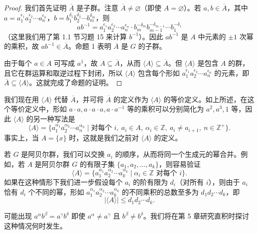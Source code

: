 \begin{proof}
我们首先证明 \(\overline{A}\) 是子群。注意 \(\overline{A} \neq \varnothing\)（即使 \(A = \varnothing\)）。若 \(a, b \in \overline{A}\)，其中 \(a = a_1^{\epsilon_1} a_2^{\epsilon_2} \cdots a_n^{\epsilon_n}\)，\(b = b_1^{\delta_1} b_2^{\delta_2} \cdots b_m^{\delta_m}\)，则
\[
ab^{-1} = a_1^{\epsilon_1} a_2^{\epsilon_2} \cdots a_n^{\epsilon_n} \cdot b_m^{-\delta_m} b_{m-1}^{-\delta_{m-1}} \cdots b_1^{-\delta_1}
\]
（这里我们用了第 1.1 节习题 15 来计算 \(b^{-1}\)）。因此 \(ab^{-1}\) 是 \(A\) 中元素的 \(\pm 1\) 次幂的乘积，故 \(ab^{-1} \in \overline{A}\)。命题 1 表明 \(\overline{A}\) 是 \(G\) 的子群。

由于每个 \(a \in A\) 可写成 \(a^1\)，故 \(A \subseteq \overline{A}\)，从而 \(\langle A \rangle \subseteq \overline{A}\)。但 \(\langle A \rangle\) 是包含 \(A\) 的群，且它在群运算和取逆过程下封闭，所以 \(\langle A \rangle\) 包含每个形如 \(a_1^{\epsilon_1} a_2^{\epsilon_2} \cdots a_n^{\epsilon_n}\) 的元素，即 \(\overline{A} \subseteq \langle A \rangle\)。这就完成了命题的证明。
\end{proof}

我们现在用 \(\langle A \rangle\) 代替 \(\overline{A}\)，并可将 \(\overline{A}\) 的定义作为 \(\langle A \rangle\) 的等价定义。如上所述，在这个等价定义中，形如 \(a \cdot a, a \cdot a \cdot a, a \cdot a^{-1}\) 等的乘积可以分别简化为 \(a^2, a^3, 1\) 等，因此 \(\langle A \rangle\) 的另一种写法是
\[
\langle A \rangle = \{ a_1^{\alpha_1} a_2^{\alpha_2} \cdots a_n^{\alpha_n} \mid \text{对每个 } i,\ a_i \in A,\ \alpha_i \in \mathbb{Z},\ a_i \neq a_{i+1},\ n \in \mathbb{Z}^+ \}.
\]
事实上，当 \(A = \{x\}\) 时，这就是我们之前对 \(\langle A \rangle\) 的定义。

若 \(G\) 是阿贝尔群，我们可以交换 \(a_i\) 的顺序，从而将同一个生成元的幂合并。例如，若 \(A\) 是阿贝尔群 \(G\) 的有限子集 \(\{a_1, a_2, \ldots, a_k\}\)，则容易验证
\[
\langle A \rangle = \{ a_1^{\alpha_1} a_2^{\alpha_2} \cdots a_k^{\alpha_k} \mid \alpha_i \in \mathbb{Z} \text{ 对每个 } i \}.
\]
如果在这种情形下我们进一步假设每个 \(a_i\) 的阶有限为 \(d_i\)（对所有 \(i\)），则由于 \(a_i\) 恰有 \(d_i\) 个不同的幂，形如 \(a_1^{\alpha_1} a_2^{\alpha_2} \cdots a_k^{\alpha_k}\) 的不同乘积的总数至多为 \(d_1 d_2 \cdots d_k\)，即
\[
|\langle A \rangle| \leq d_1 d_2 \cdots d_k.
\]

可能出现 \(a^{\alpha} b^{\beta} = a^{\gamma} b^{\delta}\) 即使 \(a^{\alpha} \neq a^{\gamma}\) 且 \(b^{\beta} \neq b^{\delta}\)。我们将在第 5 章研究直积时探讨这种情况何时发生。

